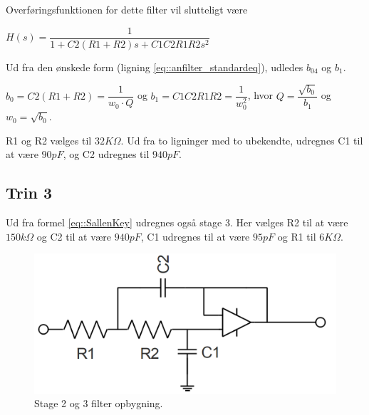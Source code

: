 Overføringsfunktionen for dette filter vil slutteligt være\\

\begin{center}
\begin{math}
H(s) = \dfrac{1}{1+C2(R1+R2) s+C1C2R1R2 s^2}
\label{eq::SallenKey}
\end{math}
\end{center} 
Ud fra den ønskede form (ligning \ref{eq::anfilter_standardeq}), udledes $b_04$ og $b_1$.
\begin{center}
	 $b_0 = C2(R1+R2) = \dfrac{1}{w_0\cdot Q}$ og $b_1 = C1C2R1R2 = \dfrac{1}{w_0^2}$, hvor $Q = \dfrac{\sqrt{b_0}}{b_1}$ og $w_0 = \sqrt{b_0}$.
\end{center}
R1 og R2 vælges til $32K\Omega$. Ud fra to ligninger med to ubekendte, udregnes C1 til at være $90pF$, og C2 udregnes til $940pF$.\\
\subsection{Trin 3}
Ud fra formel \ref{eq::SallenKey} udregnes også stage 3. Her vælges R2 til at være $150k\Omega$ og C2 til at være $940pF$, C1 udregnes til at være $95pF$ og R1 til $6K\Omega$. 


\begin{figure}[h!]
	\centering
	\includegraphics[scale=0.3]{./billeder/stage23}
	\caption{Stage 2 og 3 filter opbygning.}
	\label{fig::filter_stage2}
\end{figure}
\FloatBlock

